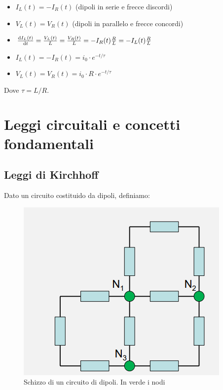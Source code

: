 \documentclass{article}
\begin{document}
\begin{itemize}
  \item $I_L (t) = - I_R (t)$ (dipoli in serie e frecce discordi)
  \item $V_L (t) = V_R (t)$ (dipoli in parallelo e frecce concordi)
  \item $\frac{\textrm d I_L (t)}{\textrm d t} = \frac{V_L (t)}{L} = \frac{V_R (t)}{L} = -I_R (t) \frac{R}{L} = -I_L (t) \frac{R}{L}$
  \item $I_L (t) = -I_R (t) = i_0 \cdot e^{-t/\tau}$
  \item $V_L (t) = V_R (t) = i_0 \cdot R \cdot e^{-t/\tau}$
\end{itemize}

Dove $\tau = L/R$.











\newpage

\section{Leggi circuitali e concetti fondamentali}

\subsection{Leggi di Kirchhoff}

Dato un circuito costituido da dipoli, definiamo:

\begin{figure}[h]
  \centering
  \includegraphics[scale=0.4]{IM_kirchhoff_nodi}
  \caption{Schizzo di un circuito di dipoli. In verde i nodi}
  \label{Schema_nodi}
\end{figure}
\end{document}
